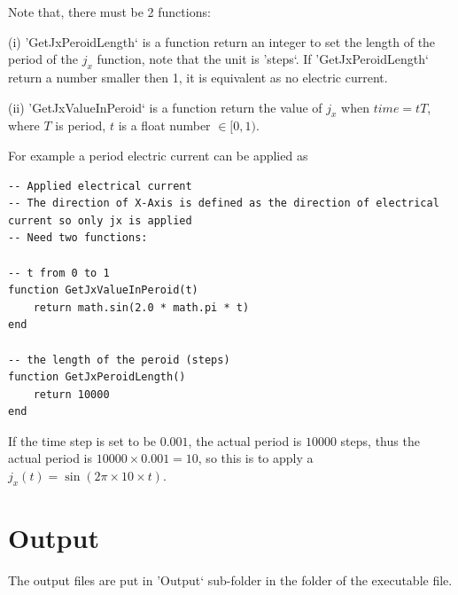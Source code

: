 \documentclass[aps,superscriptaddress,groupedaddress]{revtex4}  %
\begin{document}
Note that, there must be 2 functions:

(i) 'GetJxPeroidLength` is a function return an integer to set the length of the period of the $j_x$ function, note that the unit is 'steps`. If 'GetJxPeroidLength` return a number smaller then 1, it is equivalent as no electric current.

(ii) 'GetJxValueInPeroid` is a function return the value of $j_x$ when $time=t T$, where $T$ is period, $t$ is a float number $\in [0,1)$.


For example a period electric current can be applied as
\begin{lstlisting}
-- Applied electrical current
-- The direction of X-Axis is defined as the direction of electrical current so only jx is applied
-- Need two functions:

-- t from 0 to 1
function GetJxValueInPeroid(t)
    return math.sin(2.0 * math.pi * t)
end

-- the length of the peroid (steps)
function GetJxPeroidLength()
    return 10000
end
\end{lstlisting}

If the time step is set to be $0.001$, the actual period is $10000$ steps, thus the actual period is $10000 \times 0.001 = 10$, so this is to apply a $j_x(t)=\sin (2\pi \times 10 \times t)$.



\section{\label{sec:6}Output}

The output files are put in 'Output` sub-folder in the folder of the executable file.
\end{document}
